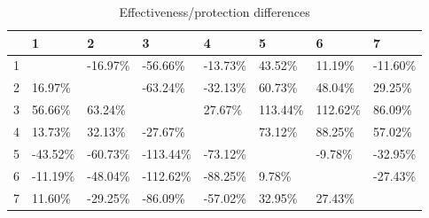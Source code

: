 \begin{table}[ht]
\centering
\begin{tabular}{rlllllll}
  \hline
 & 1 & 2 & 3 & 4 & 5 & 6 & 7 \\ 
  \hline
1 &  & -16.97\% & -56.66\% & -13.73\% & 43.52\% & 11.19\% & -11.60\% \\ 
  2 & 16.97\% &  & -63.24\% & -32.13\% & 60.73\% & 48.04\% & 29.25\% \\ 
  3 & 56.66\% & 63.24\% &  & 27.67\% & 113.44\% & 112.62\% & 86.09\% \\ 
  4 & 13.73\% & 32.13\% & -27.67\% &  & 73.12\% & 88.25\% & 57.02\% \\ 
  5 & -43.52\% & -60.73\% & -113.44\% & -73.12\% &  & -9.78\% & -32.95\% \\ 
  6 & -11.19\% & -48.04\% & -112.62\% & -88.25\% & 9.78\% &  & -27.43\% \\ 
  7 & 11.60\% & -29.25\% & -86.09\% & -57.02\% & 32.95\% & 27.43\% &  \\ 
   \hline
\end{tabular}
\caption{Effectiveness/protection differences} 
\end{table}

